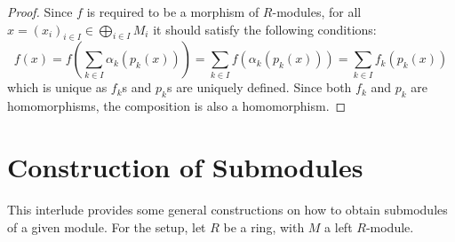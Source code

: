 \begin{proof}
    Since $f$ is required to be a morphism of $R$-modules, for all $x = (x_i)_{i\in I} \in \bigoplus_{i\in I} M_i$ it should satisfy the following conditions:
    \[
        f(x) = f\left( \sum\limits_{k\in I} \alpha_k(p_k(x)) \right) = \sum\limits_{k\in I} f(\alpha_k(p_k(x))) = \sum\limits_{k\in I} f_k(p_k(x))
    \]
    which is unique as $f_k$s and $p_k$s are uniquely defined. Since both $f_k$ and $p_k$ are homomorphisms, the composition is also a homomorphism.
\end{proof}

\section{Construction of Submodules}

This interlude provides some general constructions on how to obtain submodules of a given module. For the setup, let $R$ be a ring, with $M$ a left $R$-module.

